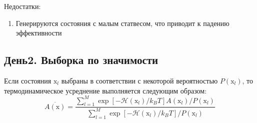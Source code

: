 \documentclass[article]{ncc}
\renewcommand{\vec}[1]{\boldsymbol{\mathrm{#1}}}
\begin{document}
Недостатки:
\begin{enumerate}
    \item Генерируются состояния с малым статвесом, что приводит к падению эффективности
\end{enumerate}

\subsection{День2. Выборка по значимости}

Если состояния \(\vec{x}_l\) выбраны в соответствии с некоторой вероятностью \(P(\vec{x}_l)\), то термодинамическое усреднение выполняется следующим образом:
\begin{equation}
\overline{A(\vec{x})}=\frac{\sum\limits_{l=1}^{M} \exp[-\mathcal{H}(\vec{x}_l)/k_BT]A(\vec{x}_l)/P(\vec{x}_l)}
                              {\sum\limits_{l=1}^{M} \exp[-\mathcal{H}(\vec{x}_l)/k_BT]/P(\vec{x}_l)}
\end{equation}
\end{document}
